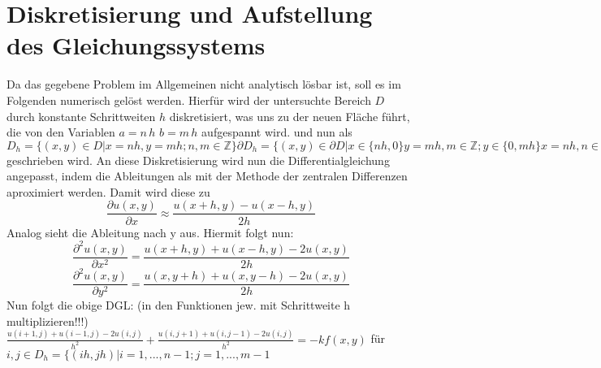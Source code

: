 \section{Diskretisierung und Aufstellung des Gleichungssystems}
Da das gegebene Problem im Allgemeinen nicht analytisch lösbar ist, soll es im Folgenden numerisch gelöst werden. Hierfür wird der untersuchte Bereich $D$ durch konstante Schrittweiten $h$ diskretisiert, was uns zu der neuen Fläche führt, die von den Variablen $a=n\,h$ $b=m\, h$ aufgespannt wird. und nun als $D_h=\{(x,y)\in D | x=nh, y=mh ; n,m \in \mathbb{Z}\} \partial D_h=\{(x,y) \in \partial D | x \in \{ nh, 0\} y= mh, m\in \mathbb{Z}; y \in \{0, mh\} x=nh, n\in \mathbb{Z}\}$ geschrieben wird.
An diese Diskretisierung wird nun die Differentialgleichung angepasst, indem die Ableitungen als mit der Methode der zentralen Differenzen aproximiert werden. Damit wird diese zu 
\[\frac{\partial u(x,y)}{\partial x} \approx \frac{u(x+h, y)-u(x-h,y)}{2h}\]
Analog sieht die Ableitung nach y aus. Hiermit folgt nun:\\
\[\frac{\partial^2 u(x,y)}{\partial x^2}=\frac{u(x+h,y)+u(x-h,y)-2u(x,y)}{2h}\]
\[\frac{\partial^2 u(x,y)}{\partial y^2}=\frac{u(x,y+h)+u(x,y-h)-2u(x,y)}{2h}\]
Nun folgt die obige DGL: (in den Funktionen jew. mit Schrittweite h multiplizieren!!!)
$\frac{u(i+1,j)+u(i-1,j)-2u(i,j)}{h^2}+\frac{u(i,j+1)+u(i,j-1)-2u(i,j)}{h^2}=-k f(x,y)$ für $i,j \in D_h=\{(ih,jh)|i=1,...,n-1; j=1,...,m-1$
